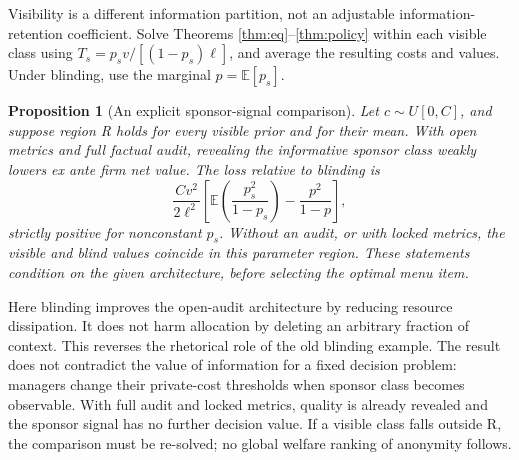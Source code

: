 \documentclass[11pt]{article}
\newtheorem{proposition}[theorem]{Proposition}
\newcommand{\E}{\mathbb E}
\begin{document}
Visibility is a different information partition, not an adjustable information-retention coefficient. Solve Theorems \ref{thm:eq}--\ref{thm:policy} within each visible class using $T_s=p_sv/[(1-p_s)\ell]$, and average the resulting costs and values. Under blinding, use the marginal $p=\E[p_s]$.
\begin{proposition}[An explicit sponsor-signal comparison]\label{prop:sponsor}
Let $c\sim U[0,C]$, and suppose region R holds for every visible prior and for their mean. With open metrics and full factual audit, revealing the informative sponsor class weakly lowers ex ante firm net value. The loss relative to blinding is
\begin{equation}\frac{Cv^2}{2\ell^2}\left[\E\!\left(\frac{p_s^2}{1-p_s}\right)-\frac{p^2}{1-p}\right],\label{eq:sponsor}\end{equation}
strictly positive for nonconstant $p_s$. Without an audit, or with locked metrics, the visible and blind values coincide in this parameter region. These statements condition on the given architecture, before selecting the optimal menu item.
\end{proposition}
Here blinding improves the open-audit architecture by reducing resource dissipation. It does not harm allocation by deleting an arbitrary fraction of context. This reverses the rhetorical role of the old blinding example. The result does not contradict the value of information for a fixed decision problem: managers change their private-cost thresholds when sponsor class becomes observable. With full audit and locked metrics, quality is already revealed and the sponsor signal has no further decision value. If a visible class falls outside R, the comparison must be re-solved; no global welfare ranking of anonymity follows.
\end{document}

